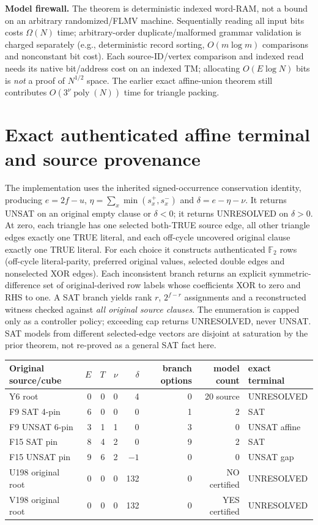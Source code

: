 \documentclass[11pt]{article}
\newcommand{\GF}{\mathbb F_2}
\begin{document}
\noindent\textbf{Model firewall.} The theorem is deterministic indexed word-RAM, not a bound on an arbitrary randomized/FLMV machine. Sequentially reading all input bits costs $\Omega(N)$ time; arbitrary-order duplicate/malformed grammar validation is charged separately (e.g., deterministic record sorting, $O(m\log m)$ comparisons and nonconstant bit cost). Each source-ID/vertex comparison and indexed read needs its native bit/address cost on an indexed TM; allocating $O(E\log N)$ bits is \emph{not} a proof of $N^{1/2}$ space. The earlier exact affine-union theorem still contributes $O(3^\nu\operatorname{poly}(N))$ time for triangle packing.

\section{Exact authenticated affine terminal and source provenance}
The implementation uses the inherited signed-occurrence conservation identity, producing $e=2f-u$, $\eta=\sum_x\min(s_x^+,s_x^-)$ and $\delta=e-\eta-\nu$. It returns UNSAT on an original empty clause or $\delta<0$; it returns UNRESOLVED on $\delta>0$. At zero, each triangle has one selected both-TRUE source edge, all other triangle edges exactly one TRUE literal, and each off-cycle uncovered original clause exactly one TRUE literal. For each choice it constructs authenticated $\GF$ rows (off-cycle literal-parity, preferred original values, selected double edges and nonselected XOR edges). Each inconsistent branch returns an explicit symmetric-difference set of original-derived row labels whose coefficients XOR to zero and RHS to one. A SAT branch yields rank $r$, $2^{f-r}$ assignments and a reconstructed witness checked against \emph{all original source clauses}. The enumeration is capped only as a controller policy; exceeding cap returns UNRESOLVED, never UNSAT. SAT models from different selected-edge vectors are disjoint at saturation by the prior theorem, not re-proved as a general SAT fact here.

\begin{center}\begin{tabular}{lrrrrrrl}\toprule
Original source/cube & $E$ & $T$ & $\nu$ & $\delta$ & branch options & model count & exact terminal\\\midrule
Y6 root &0&0&0&4&0&20 source&UNRESOLVED\\
F9 SAT 4-pin &6&0&0&0&1&2&SAT\\
F9 UNSAT 6-pin &3&1&1&0&3&0&UNSAT affine\\
F15 SAT pin &8&4&2&0&9&2&SAT\\
F15 UNSAT pin &9&6&2&$-1$&0&0&UNSAT gap\\
U198 original root &0&0&0&132&0&NO certified&UNRESOLVED\\
V198 original root &0&0&0&132&0&YES certified&UNRESOLVED\\\bottomrule\end{tabular}\end{center}
\end{document}
